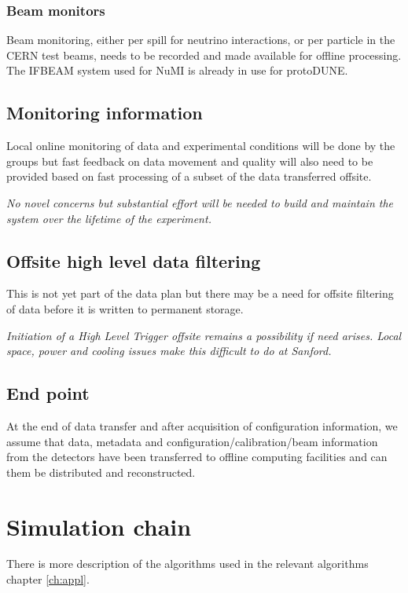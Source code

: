 \documentclass[../main-v1.tex]{subfiles}
\begin{document}
\subsubsection{Beam monitors}
Beam monitoring, either per spill for neutrino interactions, or per particle in the CERN test beams, needs to be recorded and made available for offline processing. 
The IFBEAM system used for NuMI is already in use for protoDUNE.

\subsection{Monitoring information}
Local online monitoring of data and experimental conditions will be done by the  groups but fast feedback on data movement and quality will also need to be provided based on fast processing of a subset of the data transferred offsite. 

{\it No novel concerns but substantial effort will be needed to build and maintain the system over the lifetime of the experiment.}

\subsection{Offsite high level data filtering}
This is not yet part of the data plan but there may be a need for offsite filtering of data before it is written to permanent storage. 

{\it  Initiation of a High Level Trigger offsite remains a possibility if need arises. Local space, power and cooling issues make this difficult to do at Sanford.}

\subsection{End point}
At the end of data transfer and after acquisition of configuration information,  we assume that data, metadata and configuration/calibration/beam information from the detectors have been transferred to offline computing facilities and can them be distributed and reconstructed. 




\section{Simulation chain}

There is more description of the algorithms used in the relevant algorithms chapter \ref{ch:appl}.  
\end{document}
